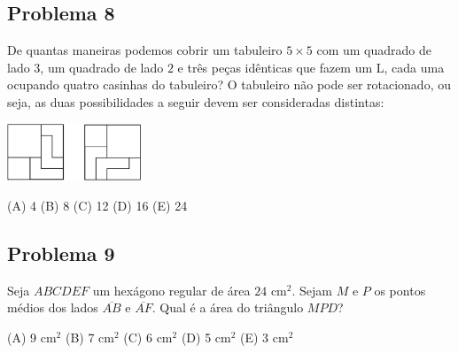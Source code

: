 \documentclass[12pt]{article}
\begin{document}
\subsection{Problema 8}
\begin{tcolorbox}[statementbox]
De quantas maneiras podemos cobrir um tabuleiro $5\times 5$ com um quadrado de lado $3$, um quadrado de lado $2$ e três peças idênticas que fazem um L, cada uma ocupando quatro casinhas do tabuleiro? O tabuleiro não pode ser rotacionado, ou seja, as duas possibilidades a seguir devem ser consideradas distintas:

    \begin{center}
    \includegraphics[width=0.3\textwidth]{third.png}
  \end{center}


(A) 4 (B) 8 (C) 12 (D) 16 (E) 24
\end{tcolorbox}
\clearpage

\subsection{Problema 9}
\begin{tcolorbox}[statementbox]
Seja $ABCDEF$ um hexágono regular de área $24$ cm$^{2}$. Sejam $M$ e $P$ os pontos médios dos lados $\overline{AB}$ e $\overline{AF}$. Qual é a área do triângulo $MPD$?

(A) 9 cm$^{2}$ (B) 7 cm$^{2}$ (C) 6 cm$^{2}$ (D) 5 cm$^{2}$ (E) 3 cm$^{2}$
\end{tcolorbox}
\clearpage
\end{document}

